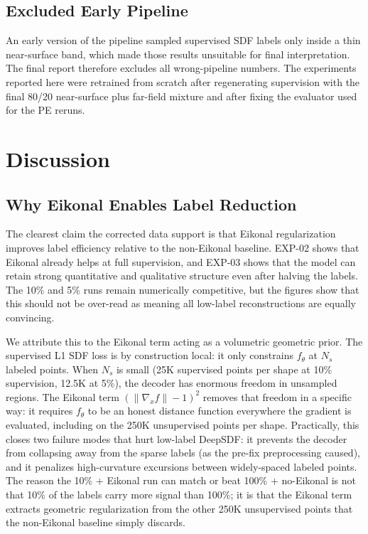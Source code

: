 \documentclass[conference]{IEEEtran}
\begin{document}
\subsection{Excluded Early Pipeline}
\label{sec:preprocess_bug}

An early version of the pipeline sampled supervised SDF labels only inside a
thin near-surface band, which made those results unsuitable for final
interpretation. The final report therefore excludes all wrong-pipeline numbers.
The experiments reported here were retrained from scratch after regenerating
supervision with the final 80/20 near-surface plus far-field mixture and after
fixing the evaluator used for the PE reruns.

\section{Discussion}

\subsection{Why Eikonal Enables Label Reduction}
\label{sec:why_eikonal}

The clearest claim the corrected data support is that Eikonal regularization
improves label efficiency relative to the non-Eikonal baseline. EXP-02 shows
that Eikonal already helps at full supervision, and EXP-03 shows that the model
can retain strong quantitative and qualitative structure even after halving the
labels. The 10\% and 5\% runs remain numerically competitive, but the figures
show that this should not be over-read as meaning all low-label reconstructions
are equally convincing.

We attribute this to the Eikonal term acting as a volumetric geometric prior. The supervised L1 SDF loss is by construction local: it only constrains $f_\theta$ at $N_s$ labeled points. When $N_s$ is small (25K supervised points per shape at 10\% supervision, 12.5K at 5\%), the decoder has enormous freedom in unsampled regions. The Eikonal term $(\|\nabla_x f\| - 1)^2$ removes that freedom in a specific way: it requires $f_\theta$ to be an honest distance function everywhere the gradient is evaluated, including on the 250K unsupervised points per shape. Practically, this closes two failure modes that hurt low-label DeepSDF: it prevents the decoder from collapsing away from the sparse labels (as the pre-fix preprocessing caused), and it penalizes high-curvature excursions between widely-spaced labeled points. The reason the 10\% + Eikonal run can match or beat 100\% + no-Eikonal is not that 10\% of the labels carry more signal than 100\%; it is that the Eikonal term extracts geometric regularization from the other 250K unsupervised points that the non-Eikonal baseline simply discards.
\end{document}
